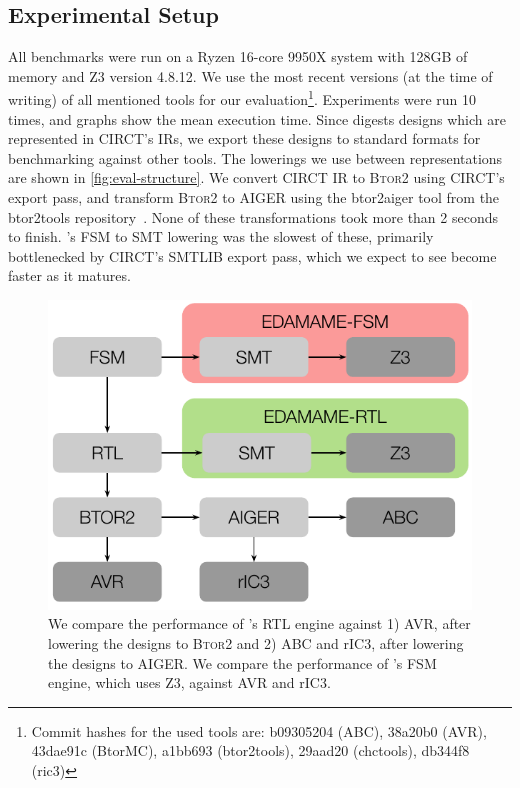 \documentclass[acmsmall,screen,review]{acmart}
\begin{document}
\subsection{Experimental Setup}
All benchmarks were run on a Ryzen 16-core 9950X system with 128GB of memory and Z3 version 4.8.12.
We use the most recent versions (at the time of writing) of all mentioned tools for our evaluation\footnote{Commit hashes for the used tools are:
  b09305204 (ABC), 38a20b0 (AVR), 43dae91c (BtorMC), a1bb693 (btor2tools), 29aad20 (chctools), db344f8 (ric3)
}.
Experiments were run 10 times, and graphs show the mean execution time.
Since \toolname{} digests designs which are represented in CIRCT's IRs, we export these designs to standard formats for benchmarking against other tools.
The lowerings we use between representations are shown in \autoref{fig:eval-structure}.
We convert CIRCT IR to B\textsc{tor}2 using CIRCT's export pass, and transform B\textsc{tor}2 to AIGER using the btor2aiger tool from the btor2tools repository~\cite{btor2tools}.
None of these transformations took more than 2 seconds to finish.
\toolname{}'s FSM to SMT lowering was the slowest of these, primarily bottlenecked by CIRCT's SMTLIB export pass, which we expect to see become faster as it matures.

\begin{figure}[t]
  \centering
  \includegraphics[width=\columnwidth]{methodology.pdf}
  \caption{We compare the performance of \toolname{}'s RTL engine against 1) AVR, after lowering the designs to B\textsc{tor}2 and 2) ABC and rIC3, after lowering the designs to AIGER.
           We compare the performance of \toolname{}'s FSM engine, which uses Z3, against AVR and rIC3.}
  \label{fig:eval-structure}
\end{figure}
\end{document}
